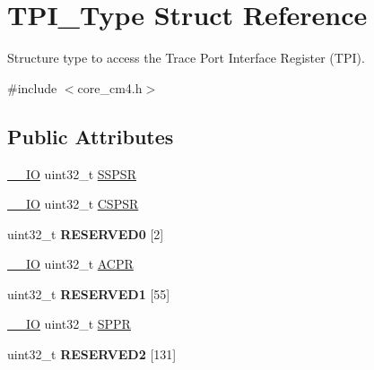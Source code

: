 \hypertarget{struct_t_p_i___type}{}\section{T\+P\+I\+\_\+\+Type Struct Reference}
\label{struct_t_p_i___type}


Structure type to access the Trace Port Interface Register (T\+PI).  




{\ttfamily \#include $<$core\+\_\+cm4.\+h$>$}

\subsection*{Public Attributes}
\begin{DoxyCompactItemize}
\item 
\hyperlink{core__cm4_8h_aec43007d9998a0a0e01faede4133d6be}{\+\_\+\+\_\+\+IO} uint32\+\_\+t \hyperlink{struct_t_p_i___type_a158e9d784f6ee6398f4bdcb2e4ca0912}{S\+S\+P\+SR}
\item 
\hyperlink{core__cm4_8h_aec43007d9998a0a0e01faede4133d6be}{\+\_\+\+\_\+\+IO} uint32\+\_\+t \hyperlink{struct_t_p_i___type_aa723ef3d38237aa2465779b3cc73a94a}{C\+S\+P\+SR}
\item 
uint32\+\_\+t {\bfseries R\+E\+S\+E\+R\+V\+E\+D0} \mbox{[}2\mbox{]}\hypertarget{struct_t_p_i___type_af143c5e8fc9a3b2be2878e9c1f331aa9}{}\label{struct_t_p_i___type_af143c5e8fc9a3b2be2878e9c1f331aa9}

\item 
\hyperlink{core__cm4_8h_aec43007d9998a0a0e01faede4133d6be}{\+\_\+\+\_\+\+IO} uint32\+\_\+t \hyperlink{struct_t_p_i___type_ad75832a669eb121f6fce3c28d36b7fab}{A\+C\+PR}
\item 
uint32\+\_\+t {\bfseries R\+E\+S\+E\+R\+V\+E\+D1} \mbox{[}55\mbox{]}\hypertarget{struct_t_p_i___type_ac3956fe93987b725d89d3be32738da12}{}\label{struct_t_p_i___type_ac3956fe93987b725d89d3be32738da12}

\item 
\hyperlink{core__cm4_8h_aec43007d9998a0a0e01faede4133d6be}{\+\_\+\+\_\+\+IO} uint32\+\_\+t \hyperlink{struct_t_p_i___type_a3eb655f2e45d7af358775025c1a50c8e}{S\+P\+PR}
\item 
uint32\+\_\+t {\bfseries R\+E\+S\+E\+R\+V\+E\+D2} \mbox{[}131\mbox{]}\hypertarget{struct_t_p_i___type_ac7bbb92e6231b9b38ac483f7d161a096}{}\label{struct_t_p_i___type_ac7bbb92e6231b9b38ac483f7d161a096}


\end{DoxyCompactItemize}
